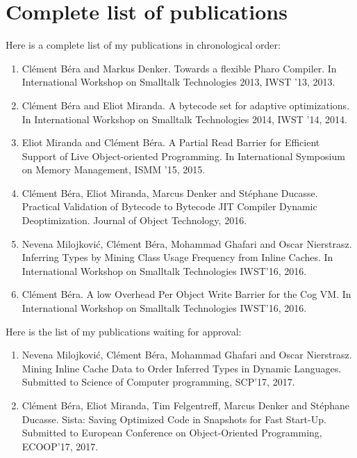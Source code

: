 \documentclass[a4paper,12pt,twoside]{../includes/ThesisStyle}
\begin{document}
\fi

\chapter{Complete list of publications}
\label{appendix:pubs}
\minitoc

Here is a complete list of my publications in chronological order:

\begin{enumerate}
	\item Cl\'ement B\'era and Markus Denker. Towards a flexible Pharo Compiler. In International Workshop on Smalltalk Technologies 2013, IWST '13, 2013.
	\item Cl\'ement B\'era and Eliot Miranda. A bytecode set for adaptive optimizations. In International Workshop on Smalltalk Technologies 2014, IWST '14, 2014.
	\item Eliot Miranda and Cl\'ement B\'era. A Partial Read Barrier for Efficient Support of Live Object-oriented Programming. In International Symposium on Memory Management, ISMM '15, 2015.
	\item Cl\'ement B\'era, Eliot Miranda, Marcus Denker and St\'ephane Ducasse. Practical Validation of Bytecode to Bytecode JIT Compiler Dynamic Deoptimization. Journal of Object Technology, 2016.
	\item Nevena Milojkovi\'c, Cl\'ement B\'era, Mohammad Ghafari and Oscar Nierstrasz. Inferring Types by Mining Class Usage Frequency from Inline Caches. In International Workshop on Smalltalk Technologies IWST'16, 2016.
	\item Cl\'ement B\'era. A low Overhead Per Object Write Barrier for the Cog VM. In International Workshop on Smalltalk Technologies IWST'16, 2016.
\end{enumerate}

Here is the list of my publications waiting for approval:

\begin{enumerate}
	\item Nevena Milojkovi\'c, Cl\'ement B\'era, Mohammad Ghafari and Oscar Nierstrasz. Mining Inline Cache Data to Order Inferred Types in Dynamic Languages. Submitted to Science of Computer programming, SCP'17, 2017.
	\item Cl\'ement B\'era, Eliot Miranda, Tim Felgentreff, Marcus Denker and St\'ephane Ducasse. Sista: Saving Optimized Code in Snapshots for Fast Start-Up. Submitted to European Conference on Object-Oriented Programming, ECOOP'17, 2017.
\end{enumerate}

\ifx\wholebook\relax\else
    
\end{document}
